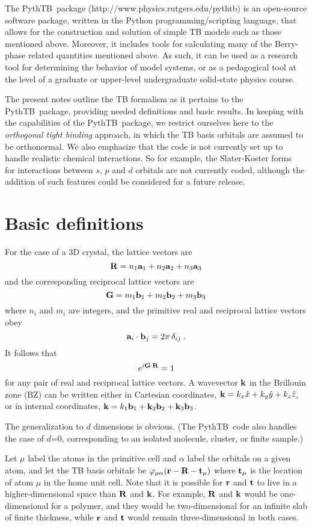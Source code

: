 \documentclass[11pt]{article}
\numberwithin{equation}{section} %
\def\beq{\begin{equation}}
\def\eeq{\end{equation}}
\def\PythTB{{\sc PythTB}}
\def\k{{\bf k}}
\def\r{{\bf r}}
\def\R{{\bf R}}
\def\G{{\bf G}}
\def\t{{\bf t}}
\def\a{{\bf a}}
\def\b{{\bf b}}
\def\t{{\bf t}}
\begin{document}
The \PythTB\ package (http://www.physics.rutgers.edu/pythtb)
is an open-source software package, written in
the Python programming/scripting language, that
allows for the construction and solution of simple TB models
such as those mentioned above.  Moreover, it includes tools
for calculating many of the Berry-phase related quantities mentioned
above.  As such, it can be used as a research tool for determining
the behavior of model systems, or as a pedagogical tool at the
level of a graduate or upper-level undergraduate solid-state
physics course.

The present notes outline the TB formalism as it pertains to the
\PythTB\ package, providing needed definitions and basic results.
In keeping with the capabilities of the \PythTB\ package, we restrict
ourselves here to the \textit{orthogonal tight binding} approach, in which
the TB basis orbitals are assumed to be orthonormal.  We also
emphasize that the code is not currently set up to handle realistic
chemical interactions. So for example, the Slater-Koster
forms~\cite{wiki-tb-me} for interactions between $s$, $p$ and $d$
orbitals are not currently coded, although the addition of such
features could be considered for a future release.


\section{Basic definitions}

For the case of a 3D crystal, the lattice vectors are
%
\beq
\R=n_1\a_1+n_2\a_2+n_3\a_3
\eeq
%
and the corresponding reciprocal lattice vectors are
%
\beq
\G=m_1\b_1+m_2\b_2+m_3\b_3
\eeq
%
where $n_i$ and $m_i$ are integers, and the primitive real
and reciprocal lattice vectors obey
%
\beq
\a_i\cdot\b_j=2\pi\,\delta_{ij} \;.
\eeq
%
It follows that
%
\beq
e^{i\G\cdot\R}=1
\label{eq:ide}
\eeq
%
for any pair of real and reciprocal lattice vectors.
A wavevector $\k$ in the Brillouin zone (BZ) can be written either in
Cartesian coordinates, $\k=k_x\hat{x}+k_y\hat{y}+k_z\hat{z}$, or
in internal coordinates, $\k=k_1\b_1+\k_2\b_2+\k_3\b_3$.

The generalization to $d$ dimensions is obvious.  (The \PythTB\ code
also handles the case of $d$=0, corresponding to an isolated molecule,
cluster, or finite sample.)

Let $\mu$ label the atoms in the primitive cell and $\alpha$ label the
orbitals on a given atom, and let the TB basis orbitals
be $\varphi_{\mu\alpha}(\r-\R-\t_\mu)$ where $\t_\mu$ is the location of
atom $\mu$ in the home unit cell.  Note that it
is possible for $\r$ and $\t$ to live in a higher-dimensional
space than $\R$ and $\k$.  For example, $\R$ and $\k$ would be
one-dimensional for a polymer, and they would be two-dimensional
for an infinite slab of finite thickness, while  $\r$ and $\t$
would remain three-dimensional in both cases.
\end{document}
